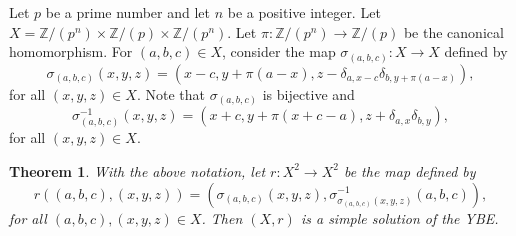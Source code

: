 \documentclass[10pt]{article}
\newtheorem{theorem}{Theorem}[section]
\newcommand{\Z}{\mathbb{Z}}
\begin{document}
 Let $p$ be a prime number and let $n$ be a positive integer. Let $X=\Z/(p^n)\times\Z/(p)\times\Z/(p^n)$.
 Let $\pi\colon \Z/(p^n)\longrightarrow \Z/(p)$ be the canonical homomorphism. For $(a,b,c)\in X$, consider the map $\sigma_{(a,b,c)}\colon X\longrightarrow X$ defined by
 $$\sigma_{(a,b,c)}(x,y,z)=(x-c, y+\pi(a-x), z-\delta_{a,x-c}\delta_{b, y+\pi(a-x)}),$$
 for all $(x,y,z)\in X$. Note that $\sigma_{(a,b,c)}$ is bijective and
 $$\sigma^{-1}_{(a,b,c)}(x,y,z)=(x+c, y+\pi(x+c-a), z+\delta_{a,x}\delta_{b,y}),$$
 for all $(x,y,z)\in X$.

 \begin{theorem}\label{main} With the above notation, let $r\colon X^2\longrightarrow X^2$ be the map defined by
 $$r((a,b,c),(x,y,z))=(\sigma_{(a,b,c)}(x,y,z), \sigma^{-1}_{\sigma_{(a,b,c)}(x,y,z)}(a,b,c)),$$
 for all $(a,b,c),(x,y,z)\in X$. Then $(X,r)$ is a simple solution of the YBE.
\end{theorem}
\end{document}
